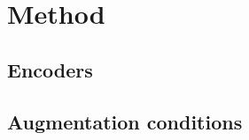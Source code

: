 \documentclass[11pt]{article}
\begin{document}
\section{Method}
\label{sec:method}

\subsection{Encoders}

\subsection{Augmentation conditions}
\end{document}
